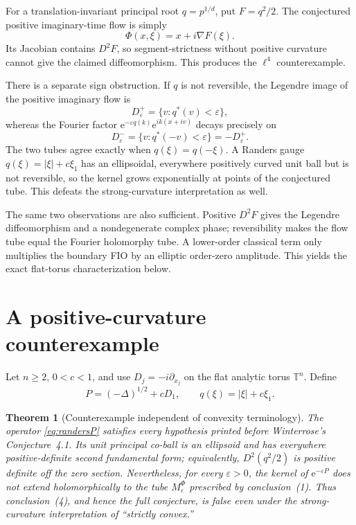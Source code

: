 \documentclass[11pt]{article}
\newtheorem{theorem}{Theorem}
\theoremstyle{remark}
\newcommand{\T}{\mathbb T}
\newcommand{\eps}{\varepsilon}
\newcommand{\ee}{\mathrm e}
\begin{document}
For a translation-invariant principal root $q=p^{1/d}$, put
$F=q^2/2$.  The conjectured positive imaginary-time flow is simply
\[
 \Phi(x,\xi)=x+i\nabla F(\xi).
\]
Its Jacobian contains $D^2F$, so segment-strictness without positive curvature
cannot give the claimed diffeomorphism.  This produces the $\ell^4$
counterexample.

There is a separate sign obstruction.  If $q$ is not reversible, the Legendre
image of the positive imaginary flow is
\[
 D_\eps^+=\{v:q^*(v)<\eps\},
\]
whereas the Fourier factor
$\ee^{-\eps q(k)}\ee^{ik(x+iv)}$ decays precisely on
\[
 D_\eps^- =\{v:q^*(-v)<\eps\}=-D_\eps^+.
\]
The two tubes agree exactly when $q(\xi)=q(-\xi)$.  A Randers gauge
$q(\xi)=|\xi|+c\xi_1$ has an ellipsoidal, everywhere positively curved unit
ball but is not reversible, so the kernel grows exponentially at points of
the conjectured tube.  This defeats the strong-curvature interpretation as
well.

The same two observations are also sufficient.  Positive $D^2F$ gives the
Legendre diffeomorphism and a nondegenerate complex phase; reversibility makes
the flow tube equal the Fourier holomorphy tube.  A lower-order classical term
only multiplies the boundary FIO by an elliptic order-zero amplitude.  This
yields the exact flat-torus characterization below.

\section{A positive-curvature counterexample}

Let $n\geq2$, $0<c<1$, and use $D_j=-i\partial_{x_j}$ on the flat analytic
torus $\T^n$.  Define
\begin{equation}\label{eq:randersP}
 P=(-\Delta)^{1/2}+cD_1,
 \qquad
 q(\xi)=|\xi|+c\xi_1.
\end{equation}

\begin{theorem}[Counterexample independent of convexity terminology]
\label{thm:randers}
The operator \eqref{eq:randersP} satisfies every hypothesis printed before
Winterrose's Conjecture~4.1.  Its unit principal co-ball is an ellipsoid and
has everywhere positive-definite second fundamental form; equivalently,
$D^2(q^2/2)$ is positive definite off the zero section.  Nevertheless, for
every $\eps>0$, the kernel of $\ee^{-\eps P}$ does not extend holomorphically
to the tube $M_\eps^\Phi$ prescribed by conclusion~\textnormal{(1)}.  Thus
conclusion~\textnormal{(4)}, and hence the full conjecture, is false even under
the strong-curvature interpretation of ``strictly convex.''
\end{theorem}
\end{document}
